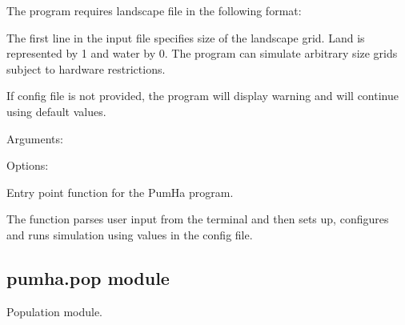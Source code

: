 \documentclass[letterpaper,10pt,english]{sphinxmanual}
\begin{document}
The program requires landscape file in the following format:

\begin{sphinxVerbatim}[commandchars=\\\{\}]
 

   
   
   
\end{sphinxVerbatim}

The first line in the input file specifies size of the landscape grid.
Land is represented by 1 and water by 0. The program can simulate arbitrary
size grids subject to hardware restrictions.

If config file is not provided, the program will display warning
and will continue using default values.

Arguments:

\begin{sphinxVerbatim}[commandchars=\\\{\}]
   
       
\end{sphinxVerbatim}

Options:

\begin{sphinxVerbatim}[commandchars=\\\{\}]
         
      
\end{sphinxVerbatim}

\begin{fulllineitems}
\label{\detokenize{pumha:pumha.main.main}}
Entry point function for the PumHa program.

The function parses user input from the terminal and then sets up,
configures and runs simulation using values in the config file.

\end{fulllineitems}



\subsection{pumha.pop module}
\label{\detokenize{pumha:pumha-pop-module}}\label{\detokenize{pumha:module-pumha.pop}}
Population module.
\end{document}
